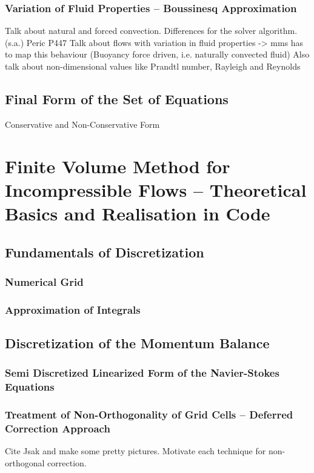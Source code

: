 \documentclass[article,type=msc,colorback,accentcolor=tud2a]{tudthesis}
\begin{document}
      \subsubsection{Variation of Fluid Properties -- Boussinesq Approximation}
      Talk about natural and forced convection. Differences for the solver algorithm. (s.a.) Peric P447
      Talk about flows with variation in fluid properties -> mms has to map this behaviour (Buoyancy force driven, i.e. naturally convected fluid)
      Also talk about non-dimensional values like Prandtl number, Rayleigh and Reynolds
    \subsection{Final Form of the Set of Equations}
        Conservative and Non-Conservative Form

  \section{Finite Volume Method for Incompressible Flows -- Theoretical Basics and Realisation in Code}

    \subsection{Fundamentals of Discretization}
      
      \subsubsection{Numerical Grid}
      \subsubsection{Approximation of Integrals}

    \subsection{Discretization of the Momentum Balance}
      
      \subsubsection{Semi Discretized Linearized Form of the Navier-Stokes Equations}
      \subsubsection{Treatment of Non-Orthogonality of Grid Cells -- Deferred Correction Approach}
        Cite Jsak and make some pretty pictures. Motivate each technique for non-orthogonal correction.
\end{document}
